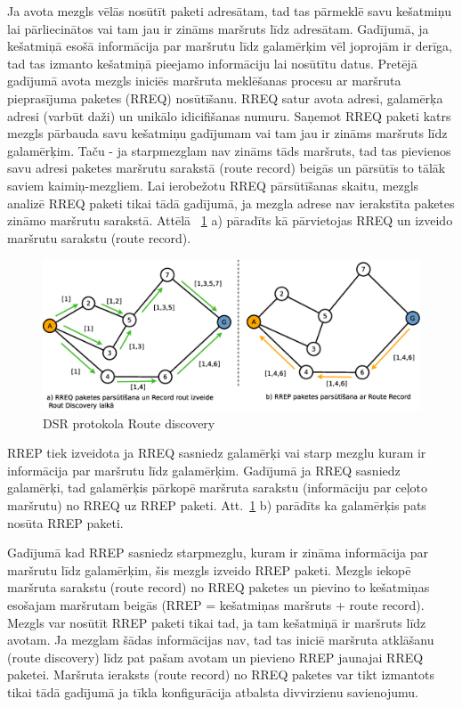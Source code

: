 Ja avota mezgls vēlās nosūtīt paketi adresātam, tad tas pārmeklē savu kešatmiņu lai pārliecinātos vai tam jau ir zināms maršruts līdz adresātam. Gadījumā, ja kešatmiņā esošā informācija par maršrutu līdz galamērķim vēl joprojām ir derīga, tad tas izmanto kešatmiņā pieejamo informāciju lai nosūtītu datus. Pretējā gadījumā avota mezgls iniciēs maršruta meklēšanas procesu ar maršruta pieprasījuma paketes (\acs{RREQ}) nosūtīšanu. RREQ satur avota  adresi, galamērķa adresi (varbūt daži) un unikālo idicifišanas numuru. Saņemot RREQ paketi katrs mezgls pārbauda savu kešatmiņu gadījumam vai tam jau ir zināms maršruts līdz galamērķim. Taču - ja starpmezglam nav zināms tāds maršruts, tad tas pievienos savu adresi paketes maršrutu sarakstā (route record) beigās un pārsūtīs to tālāk saviem kaimiņ-mezgliem. Lai ierobežotu RREQ pārsūtīšanas skaitu, mezgls analizē RREQ paketi tikai tādā gadījumā, ja mezgla adrese nav ierakstīta paketes zināmo maršrutu sarakstā. Attēlā ~\ref{fig:dsr} a) pāradīts kā pārvietojas RREQ un izveido maršrutu sarakstu (route record).
\begin{figure}[ht!]
\centering
\includegraphics[scale=0.4]{./graph/dsr1}
 \caption{DSR protokola Route discovery}
\label{fig:dsr}
\end{figure}

\acf{RREP}  tiek izveidota ja RREQ sasniedz  galamērķi vai starp mezglu kuram ir informācija par maršrutu līdz galamērķim. Gadījumā ja RREQ sasniedz galamērķi, tad  galamērķis pārkopē maršruta sarakstu (informāciju  par ceļoto maršrutu) no RREQ uz RREP  paketi. Att.~\ref{fig:dsr} b) parādīts ka galamērķis pats nosūta RREP paketi.

Gadījumā kad RREP sasniedz starpmezglu, kuram ir zināma informācija par maršrutu līdz galamērķim, šis mezgls izveido RREP paketi. Mezgls iekopē maršruta sarakstu (route record) no RREQ paketes un pievino to kešatmiņas esošajam maršrutam beigās (RREP = kešatmiņas maršruts + route record). Mezgls var nosūtīt RREP paketi tikai tad, ja tam kešatmiņā ir maršruts līdz avotam. Ja mezglam šādas informācijas nav, tad tas iniciē maršruta atklāšanu (route discovery) līdz pat pašam avotam un pievieno RREP jaunajai RREQ paketei. Maršruta ieraksts (route record) no RREQ paketes var tikt izmantots tikai tādā gadījumā ja tīkla konfigurācija atbalsta divvirzienu savienojumu.

